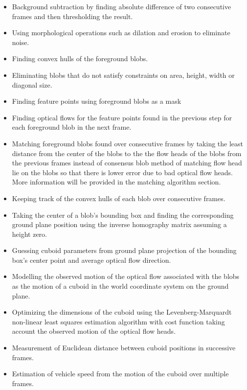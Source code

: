 \documentclass[a4paper]{aitthesis}
\begin{document}
\begin{itemize}
\item  Background subtraction by finding absolute difference of two consecutive frames and then thresholding the result.
\item Using morphological operations such as dilation and erosion to eliminate noise.
\item Finding convex hulls of the foreground blobs.
\item Eliminating blobs that do not satisfy constraints on area, height, width or diagonal size.
\item Finding feature points using foreground blobs as a mask
\item Finding optical flows for the feature points found in the previous step for each foreground blob in the next frame.
\item Matching foreground blobs found over consecutive frames by taking the least distance from the center of the blobs to the the flow heads of the blobs from the previous frames instead of consensus blob method of matching flow head lie on the blobs so that there is lower error due to bad optical flow heads. More information will be provided in the matching algorithm section.
\item Keeping track of the convex hulls of each blob over consecutive frames.
\item Taking the center of a blob's bounding box and finding the corresponding ground plane position using the inverse homography matrix assuming a height zero.
\item Guessing cuboid parameters from ground plane projection of the bounding box's center point and average optical flow direction.
\item Modelling the observed motion of the optical flow associated with the blobs as the motion of a cuboid in the world coordinate system on the ground plane.
\item Optimizing the dimensions of the cuboid using the Levenberg-Marquardt non-linear least squares estimation algorithm with cost function taking account the observed motion of the optical flow heads.
\item Measurement of Euclidean distance between cuboid positions in successive frames.
\item Estimation of vehicle speed from the motion of the cuboid over multiple frames.

\end{itemize}
\end{document}
